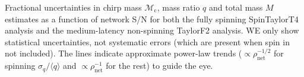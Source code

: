 \label{fig:Mc_q_std_snr} Fractional uncertainties in chirp mass $\mathcal{M}_\mathrm{c}$, mass ratio $q$ and total mass $M$ estimates as a function of network S/N for both the fully spinning SpinTaylorT4 analysis and the medium-latency non-spinning TaylorF2 analysis. WE only show statistical uncertainties, not systematic errors (which are present when spin in not included). The lines indicate approximate power-law trends ($\propto \rho_\mathrm{net}^{-1/2}$ for spinning $\sigma_q/\langle q\rangle$ and $\propto \rho_\mathrm{net}^{-1}$ for the rest) to guide the eye.
  
  